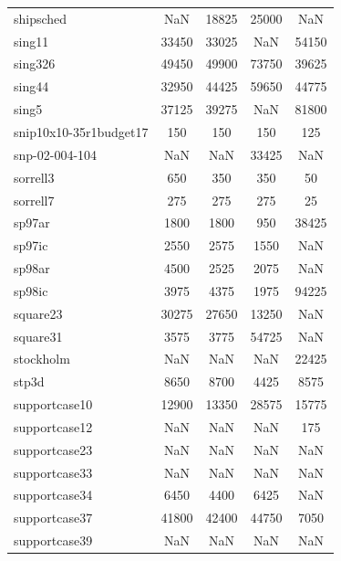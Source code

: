 \begin{longtable}{lcccc}
shipsched                   &      NaN &    18825 &    25000 &   NaN \\
sing11                      &    33450 &    33025 &      NaN & 54150 \\
sing326                     &    49450 &    49900 &    73750 & 39625 \\
sing44                      &    32950 &    44425 &    59650 & 44775 \\
sing5                       &    37125 &    39275 &      NaN & 81800 \\
snip10x10-35r1budget17      &      150 &      150 &      150 &   125 \\
snp-02-004-104              &      NaN &      NaN &    33425 &   NaN \\
sorrell3                    &      650 &      350 &      350 &    50 \\
sorrell7                    &      275 &      275 &      275 &    25 \\
sp97ar                      &     1800 &     1800 &      950 & 38425 \\
sp97ic                      &     2550 &     2575 &     1550 &   NaN \\
sp98ar                      &     4500 &     2525 &     2075 &   NaN \\
sp98ic                      &     3975 &     4375 &     1975 & 94225 \\
square23                    &    30275 &    27650 &    13250 &   NaN \\
square31                    &     3575 &     3775 &    54725 &   NaN \\
stockholm                   &      NaN &      NaN &      NaN & 22425 \\
stp3d                       &     8650 &     8700 &     4425 &  8575 \\
supportcase10               &    12900 &    13350 &    28575 & 15775 \\
supportcase12               &      NaN &      NaN &      NaN &   175 \\
supportcase23               &      NaN &      NaN &      NaN &   NaN \\
supportcase33               &      NaN &      NaN &      NaN &   NaN \\
supportcase34               &     6450 &     4400 &     6425 &   NaN \\
supportcase37               &    41800 &    42400 &    44750 &  7050 \\
supportcase39               &      NaN &      NaN &      NaN &   NaN \\

\end{longtable}
